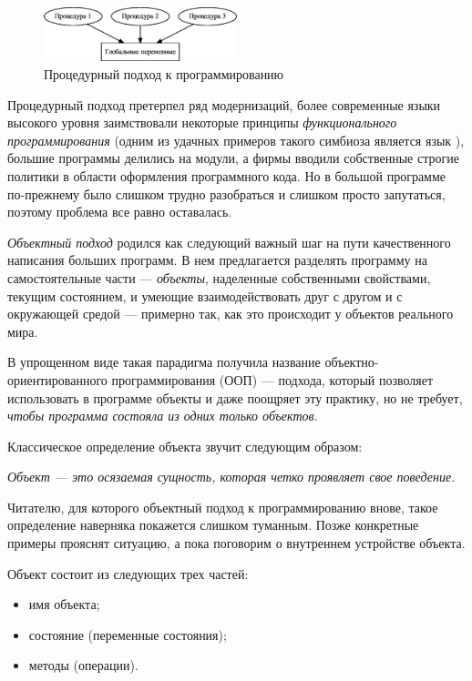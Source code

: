 \begin{figure}[htb]
\begin{center}
\includegraphics[width=0.5\textwidth]{img/ris_10_1}
\caption{Процедурный подход к программированию}
\label{ch10:refDrawing0}
\end{center}
\end{figure}



Процедурный подход претерпел ряд модернизаций, более современные языки высокого уровня заимствовали некоторые принципы
\emph{функционального программирования} (одним из удачных примеров такого симбиоза является язык ),
большие программы делились на модули, а фирмы вводили собственные строгие политики в области оформления программного
кода. Но в большой программе по-прежнему было слишком трудно разобраться и слишком просто запутаться, поэтому проблема
все равно оставалась.

\emph{Объектный подход} родился как следующий важный шаг на пути качественного написания больших программ.
В нем предлагается разделять программу на самостоятельные части --- \emph{объекты}, наделенные
собственными свойствами, текущим состоянием, и умеющие взаимодействовать друг с другом и с окружающей средой --- примерно
так, как это происходит у объектов реального мира.

В упрощенном виде такая парадигма получила название объектно-ориентированного программирования (ООП) --- подхода, который
позволяет использовать в программе объекты и даже поощряет эту практику, но не требует, \emph{чтобы
программа состояла из одних только объектов}.

Классическое определение объекта звучит следующим образом:

\emph{Объект --- это осязаемая сущность, которая четко проявляет свое поведение.}

Читателю, для которого объектный подход к программированию внове, такое определение наверняка покажется слишком
туманным. Позже конкретные примеры прояснят  ситуацию, а пока поговорим о внутреннем устройстве объекта.

Объект состоит из следующих трех частей:

\begin{itemize}
\item имя объекта;
\item состояние (переменные состояния);
\item методы (операции).
\end{itemize}

